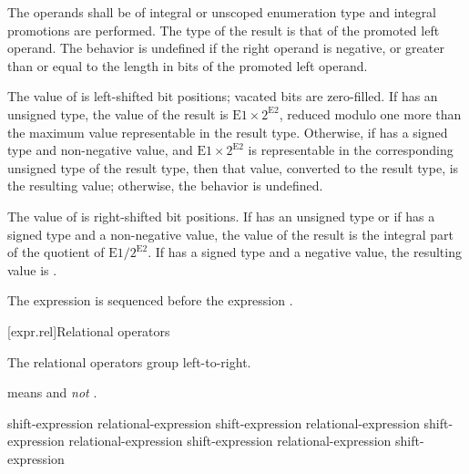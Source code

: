 The operands shall be of integral or unscoped enumeration type and integral
promotions are performed. The type of the result is that of the promoted
left operand.
%
The behavior is undefined if the right operand is negative, or greater
than or equal to the length in bits of the promoted left operand.

\pnum
The value of  is  left-shifted  bit positions; vacated bits are
zero-filled. If  has an unsigned type, the value of the result
is $\mathrm{E1}\times2^\mathrm{E2}$, reduced modulo
one more than the maximum value representable in the result type. Otherwise, if
 has a signed type and non-negative value, and $\mathrm{E1}\times2^\mathrm{E2}$ is
representable in the corresponding unsigned type of the result type, then
that value, converted to the result type, is the resulting value; otherwise, the
behavior is undefined.

\pnum
The value of  is  right-shifted 
bit positions. If  has an unsigned type or if  has a
signed type and a non-negative value, the value of the result is the
integral part of the quotient of $\mathrm{E1}/2^\mathrm{E2}$. If 
%
has a signed type and a negative value, the resulting value is
.

\pnum
The expression  is sequenced before the expression .

[expr.rel]{Relational operators}%
%

\pnum
The relational operators group left-to-right.
\begin{example}
 means  and \emph{not}
.
\end{example}

%
%
%
%
%
%
%
%
%
\begin{bnf}
\br
    shift-expression\br
    relational-expression \terminal{<} shift-expression\br
    relational-expression \terminal{>} shift-expression\br
    relational-expression \terminal{<=} shift-expression\br
    relational-expression \terminal{>=} shift-expression
\end{bnf}

